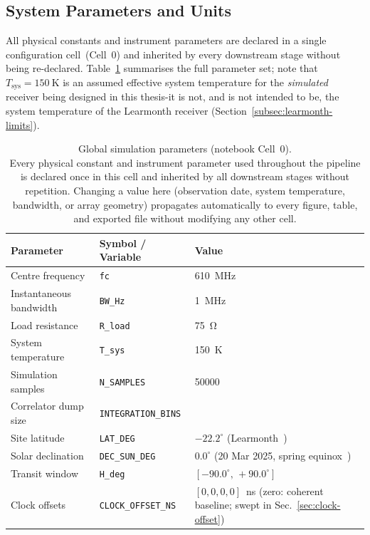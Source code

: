 \subsection{System Parameters and Units}
\label{subsec:sys-params}

All physical constants and instrument parameters are declared in a single
configuration cell~(Cell~0) and inherited by every downstream stage without
being re-declared. Table~\ref{tab:sim-params} summarises the full parameter
set; note that $T_\mathrm{sys}=\SI{150}{\kelvin}$ is an assumed effective
system temperature for the \emph{simulated} receiver being designed in this
thesis-it is not, and is not intended to be, the system temperature of the
Learmonth receiver (Section~\ref{subsec:learmonth-limits}).

\begin{table}[H]
  \centering
  \caption[Global simulation parameters (notebook Cell~0)]{Global simulation parameters (notebook Cell~0).\\[4pt]
  Every physical constant and instrument parameter used throughout the pipeline
  is declared once in this cell and inherited by all downstream stages without
  repetition. Changing a value here (observation date, system temperature,
  bandwidth, or array geometry) propagates automatically to every figure, table,
  and exported file without modifying any other cell.}
  \label{tab:sim-params}
  \renewcommand{\arraystretch}{1.25}
  \begin{tabularx}{\textwidth}{l l >{\raggedright\arraybackslash}X}
    \toprule
    \textbf{Parameter} & \textbf{Symbol / Variable} & \textbf{Value} \\
    \midrule
    Centre frequency        & \texttt{fc}               & \SI{610}{\mega\hertz} \\
    Instantaneous bandwidth & \texttt{BW\_Hz}           & \SI{1}{\mega\hertz} \\
    Load resistance         & \texttt{R\_load}          & \SI{75}{\ohm} \\
    System temperature      & \texttt{T\_sys}           & \SI{150}{\kelvin} \\
    Simulation samples      & \texttt{N\_SAMPLES}       & \num{50000} \\
    Correlator dump size    & \texttt{INTEGRATION\_BINS}& 50 \\
    Site latitude           & \texttt{LAT\_DEG}         & $-22.2^\circ$ (Learmonth~\citep{learmonth_coords}) \\
    Solar declination       & \texttt{DEC\_SUN\_DEG}    & $0.0^\circ$ (20 Mar 2025, spring equinox~\citep{jpl_horizons}) \\
    Transit window          & \texttt{H\_deg}           & $[-90.0^\circ,\,+90.0^\circ]$ \\
    Clock offsets           & \texttt{CLOCK\_OFFSET\_NS} & $[0,0,0,0]$~ns (zero: coherent baseline; swept in Sec.~\ref{sec:clock-offset}) \\
    \bottomrule
  \end{tabularx}
\end{table}


